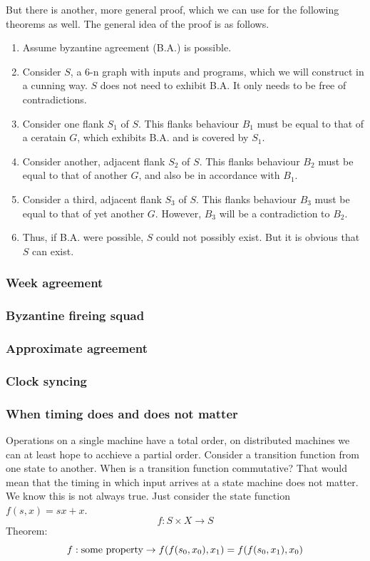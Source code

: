 But there is another, more general proof, which we can use for the following theorems as well. The general idea of the proof is as follows. 
\begin{enumerate}
    \item Assume byzantine agreement (B.A.) is possible.
    \item Consider $S$, a 6-n graph with inputs and programs, which we will construct in a cunning way. $S$ does not need to exhibit B.A. It only needs to be free of contradictions.
    \item Consider one flank $S_1$ of $S$. This flanks behaviour $B_1$ must be equal to that of a ceratain $G$, which exhibits B.A. and is covered by $S_1$. 
    \item Consider another, adjacent flank $S_2$ of $S$. This flanks behaviour $B_2$ must be equal to that of another $G$, and also be in accordance with $B_1$. 
    \item Consider a third, adjacent flank $S_3$ of $S$. This flanks behaviour $B_3$ must be equal to that of yet another $G$. However, $B_3$ will be a contradiction to $B_2$.
    \item Thus, if B.A. were possible, $S$ could not possibly exist. But it is obvious that $S$ can exist.
\end{enumerate}


\subsubsection{Week agreement}
\subsubsection{Byzantine fireing squad}
\subsubsection{Approximate agreement}
\subsubsection{Clock syncing}


\subsubsection{When timing does and does not matter}
Operations on a single machine have a total order, on distributed machines we can at least hope to acchieve a partial order.
Consider a transition function from one state to another. When is a transition function commutative? That would mean that the timing in which input arrives at a state machine does not matter. We know this is not always true. Just consider the state function $f(s, x) = sx + x$. 
$$ f : S \times X \to S$$
Theorem:
$$ f: \text{some property} \to f(f(s_0, x_0), x_1) = f(f(s_0, x_1), x_0)$$


